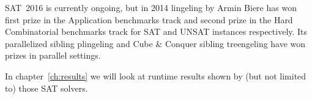 SAT~2016 is currently ongoing, but in 2014 lingeling by Armin Biere has won first prize in
the Application benchmarks track and second prize in the Hard Combinatorial benchmarks
track for SAT and UNSAT instances respectively. Its parallelized sibling plingeling
and Cube \& Conquer sibling treengeling have won prizes in parallel settings.

In chapter~\ref{ch:results} we will look at runtime results shown by (but not limited to)
those SAT solvers.








